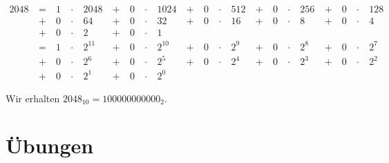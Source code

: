 \begin{example}
\label{ex:analyse-2048}
\begin{align*}
2048 & ~ = ~ & 1 & ~\cdot~ & 2048  & ~ + ~ & 0 & ~\cdot~ & 1024 & ~ + ~ & 0 & ~\cdot~ & 512 & ~ + ~ & 0 & ~\cdot~ & 256 & ~ + ~ & 0 & ~\cdot~ & 128 \\ 
& ~ + ~ & 0 & ~\cdot~ & 64 & ~ + ~ & 0 & ~\cdot~ & 32 & ~ + ~ & 0 & ~\cdot~ & 16 & ~ + ~ & 0 & ~\cdot~ & 8 & ~ + ~ & 0 & ~\cdot~ & 4 \\
& ~ + ~ & 0 & ~\cdot~ & 2 & ~ + ~ & 0 & ~\cdot~ & 1  \\
& ~ = ~ & 1 & ~\cdot~ & 2^{11}  & ~ + ~ & 0 & ~\cdot~ & 2^{10}  & ~ + ~ & 0 & ~\cdot~ & 2^9 & ~ + ~ & 0 & ~\cdot~ & 2^8 & ~ + ~ & 0 & ~\cdot~ & 2^7 \\ 
& ~ + ~ & 0 & ~\cdot~ & 2^6 & ~ + ~ & 0 & ~\cdot~ & 2^5 & ~ + ~ & 0 & ~\cdot~ & 2^4 & ~ + ~ & 0 & ~\cdot~ & 2^3 & ~ + ~ & 0 & ~\cdot~ & 2^2 \\ 
& ~ + ~ & 0 & ~\cdot~ & 2^1 & ~ + ~ & 0 & ~\cdot~ & 2^0
\end{align*}

Wir erhalten $2048_{10} = 100000000000_2$.

\end{example}

\newpage

\section{Übungen}

